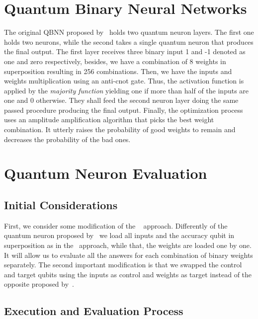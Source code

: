 \documentclass[conference]{IEEEtran}
\begin{document}
\section{Quantum Binary Neural Networks}\label{sec:quantum-binary-neural-networks}

The original QBNN proposed by~\cite{fawaz2019training} holds two quantum neuron layers.
The first one holds two neurons, while the second takes a single quantum neuron that produces the final output.
The first layer receives three binary input 1 and -1 denoted as one and zero respectively,
besides, we have a combination of 8 weights in superposition resulting in 256 combinations.
Then, we have the inputs and weights multiplication using an anti-cnot gate.
Thus, the activation function is applied by the \textit{majority function} yielding one if more than half of the inputs are one and 0 otherwise.
They shall feed the second neuron layer doing the same passed procedure producing the final output.
Finally, the optimization process uses an amplitude amplification algorithm that picks the best weight combination.
It utterly raises the probability of good weights to remain and decreases the probability of the bad ones.

\section{Quantum Neuron Evaluation}\label{sec:quantum-neuron-evaluation}

\subsection{Initial Considerations}\label{subsec:initial-considerations}

 First, we consider some modification of the ~\cite{fawaz2019training} approach.
Differently of the quantum neuron proposed by~\cite{fawaz2019training} we load all inputs and the accuracy qubit in
superposition as in the~\cite{Trugenberger_2001} approach, while that, the weights are loaded one by one.
It will allow us to evaluate all the answers for each combination of binary weights separately.
The second important modification is that we swapped the control and target qubits using the inputs as control and
weights as target instead of the opposite proposed by~\cite{fawaz2019training}.

\subsection{Execution and Evaluation Process}\label{subsec:execution-and-evaluation-process}
\end{document}

